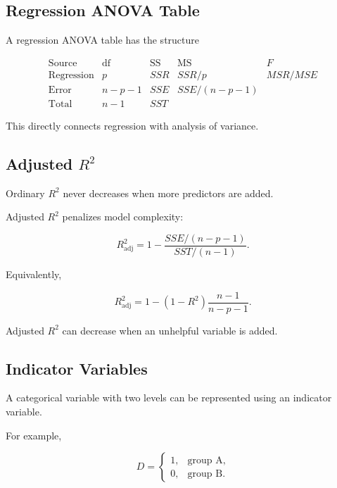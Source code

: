 \subsection{Regression ANOVA Table}
\label{subsec:regression-anova-table}

A regression ANOVA table has the structure

\[
\begin{array}{c|c|c|c|c}
\text{Source}
&
\text{df}
&
\text{SS}
&
\text{MS}
&
F
\\
\hline
\text{Regression}
&
p
&
SSR
&
SSR/p
&
MSR/MSE
\\
\text{Error}
&
n-p-1
&
SSE
&
SSE/(n-p-1)
&
\\
\text{Total}
&
n-1
&
SST
&
&
\end{array}
\]

This directly connects regression with analysis of variance.

\subsection{Adjusted \(R^2\)}
\label{subsec:adjusted-r-squared}

Ordinary \(R^2\) never decreases when more predictors are added.

Adjusted \(R^2\) penalizes model complexity:

\[
\boxed{
R_{\mathrm{adj}}^2
=
1
-
\frac{
SSE/(n-p-1)
}{
SST/(n-1)
}.
}
\]

Equivalently,

\[
\boxed{
R_{\mathrm{adj}}^2
=
1
-
(1-R^2)
\frac{
n-1
}{
n-p-1
}.
}
\]

Adjusted \(R^2\) can decrease when an unhelpful variable is added.

\subsection{Indicator Variables}
\label{subsec:indicator-variables-regression}

A categorical variable with two levels can be represented using an
indicator variable.

For example,

\[
D
=
\begin{cases}
1,&\text{group A},\\
0,&\text{group B}.
\end{cases}
\]

